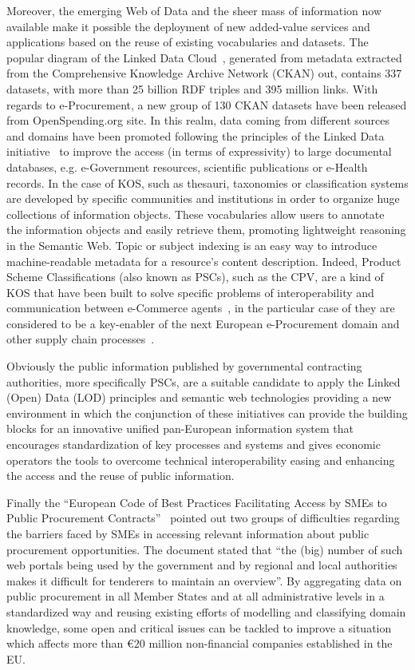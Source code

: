 \documentclass[preprint,12pt]{elsarticle}
\begin{document}
Moreover, the emerging Web of Data and the sheer mass of information now available make it possible the deployment of new 
added-value services and applications based on the reuse of existing vocabularies and datasets. 
The popular diagram of the Linked Data Cloud~\cite{linked-data-cloud}, generated from metadata extracted from the 
Comprehensive Knowledge Archive Network (CKAN) out, contains 337 datasets, with more than 25 billion RDF triples and 395 million links. 
With regards to e-Procurement, a new group of 130 CKAN datasets have been released from OpenSpending.org site. In this realm, 
data coming from different sources and domains have been promoted following the principles of the 
Linked Data initiative~\cite{Berners-Lee-2006} to improve the access (in terms of expressivity) to large documental databases, 
e.g. e-Government resources, scientific publications or e-Health records. In the case of KOS, such as thesauri, taxonomies or classification systems 
are developed by specific communities and institutions in order to organize huge collections of information objects. 
These vocabularies allow users to annotate~\cite{Leukel-standard,Leukel-automating,Leukel-comparative} the information objects and easily retrieve them, 
promoting lightweight reasoning in the Semantic Web. Topic or subject indexing is an easy way to introduce machine-readable metadata for a resource's content 
description. Indeed, Product Scheme Classifications (also known as PSCs), such as the CPV, are a kind of KOS that have been built to solve specific problems 
of interoperability and communication between e-Commerce agents~\cite{FenselOmel2001,Leukel-findings}, in the particular case of they are considered to be a key-enabler of 
the next European e-Procurement domain and other supply chain processes~\cite{DBLP:journals/tcci/Alor-HernandezAJPRMBG10}. 

Obviously the public information published by governmental contracting authorities, more specifically PSCs, are a suitable candidate to apply the Linked (Open) Data 
(LOD) principles and semantic web technologies providing a new environment in which the conjunction of these initiatives can provide the building blocks for an 
innovative unified pan-European information system that encourages standardization of key processes and systems and gives economic operators the tools to overcome 
technical interoperability easing and enhancing the access and the reuse of public information.

Finally the ``European Code of Best Practices Facilitating Access by SMEs to Public Procurement Contracts''~\cite{d2008} pointed out 
two groups of difficulties regarding the barriers faced by SMEs in accessing relevant information about public procurement opportunities. 
The document stated that ``the (big) number of such web portals being used by the government and by regional and local authorities makes it difficult 
for tenderers to maintain an overview''. By aggregating data on public procurement in all Member States 
and at all administrative levels in a standardized way and reusing existing efforts of modelling 
and classifying domain knowledge, some open and critical issues can be tackled to improve a situation which affects more 
than \euro $20$ million non-financial companies established in the EU.
\end{document}
